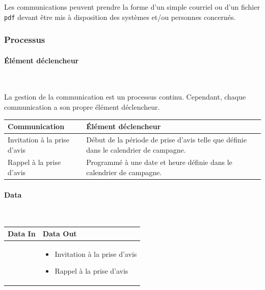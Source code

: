 \documentclass[a4paper,11pt]{report}
\begin{document}
Les communications peuvent prendre la forme d'un simple courriel ou d'un fichier \texttt{pdf} devant être mis à disposition des systèmes et/ou personnes concernés.


\subsubsection{Processus}
\paragraph{Élément déclencheur}~\newline{}

La gestion de la communication est un processus continu.
Cependant, chaque communication a son propre élément déclencheur.
\begin{tabularx}{\linewidth}{|l|X|} \hline
Communication & Élément déclencheur \\ \hline
Invitation à la prise d'avis & Début de la période de prise d'avis telle que définie dans le calendrier de campagne. \\
Rappel à la prise d'avis & Programmé à une date et heure définie dans le calendrier de campagne. \\ \hline
\end{tabularx}



\paragraph{Data}~\newline{}

\begin{tabularx}{\linewidth}{|X|X|} \hline
Data In & Data Out \\ \hline
 & 
\begin{itemize}
	\item Invitation à la prise d'avis
	\item Rappel à la prise d'avis
\end{itemize}
\\ \hline
\end{tabularx}
\end{document}
